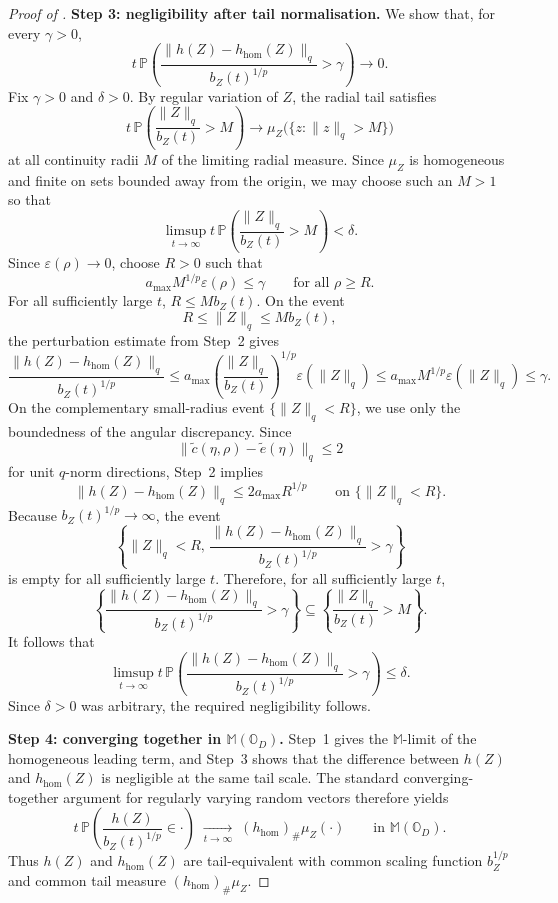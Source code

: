 \documentclass{article}
\theoremstyle{definition}
\begin{document}
\begin{proof}[Proof of ]
\textbf{Step 3: negligibility after tail normalisation.}
We show that, for every \(\gamma>0\),
\[
t\,\mathbb{P}\!\left(
\frac{\|h(Z)-h_{\mathrm{hom}}(Z)\|_q}{b_Z(t)^{1/p}}>\gamma
\right)
\longrightarrow0.
\]
Fix \(\gamma>0\) and \(\delta>0\). By regular variation of \(Z\), the radial
tail satisfies
\[
t\,\mathbb{P}\!\left(\frac{\|Z\|_q}{b_Z(t)}>M\right)
\longrightarrow
\mu_Z\bigl(\{z:\|z\|_q>M\}\bigr)
\]
at all continuity radii \(M\) of the limiting radial measure. Since
\(\mu_Z\) is homogeneous and finite on sets bounded away from the origin,
we may choose such an \(M>1\) so that
\[
\limsup_{t\to\infty}
t\,\mathbb{P}\!\left(\frac{\|Z\|_q}{b_Z(t)}>M\right)
<\delta.
\]
Since \(\varepsilon(\rho)\to0\), choose \(R>0\) such that
\[
a_{\max}M^{1/p}\varepsilon(\rho)\le\gamma
\qquad
\text{for all }\rho\ge R.
\]
For all sufficiently large \(t\), \(R\le M b_Z(t)\). On the event
\[
R\le \|Z\|_q\le M b_Z(t),
\]
the perturbation estimate from Step~2 gives
\[
\frac{\|h(Z)-h_{\mathrm{hom}}(Z)\|_q}{b_Z(t)^{1/p}}
\le
a_{\max}
\left(\frac{\|Z\|_q}{b_Z(t)}\right)^{1/p}
\varepsilon(\|Z\|_q)
\le
a_{\max}M^{1/p}\varepsilon(\|Z\|_q)
\le
\gamma.
\]
On the complementary small-radius event \(\{\|Z\|_q<R\}\), we use only the
boundedness of the angular discrepancy. Since
\[
\|\tilde c(\eta,\rho)-\tilde e(\eta)\|_q\le 2
\]
for unit \(q\)-norm directions, Step~2 implies
\[
\|h(Z)-h_{\mathrm{hom}}(Z)\|_q
\le
2a_{\max}R^{1/p}
\qquad
\text{on }\{\|Z\|_q<R\}.
\]
Because \(b_Z(t)^{1/p}\to\infty\), the event
\[
\left\{
\|Z\|_q<R,\,
\frac{\|h(Z)-h_{\mathrm{hom}}(Z)\|_q}{b_Z(t)^{1/p}}>\gamma
\right\}
\]
is empty for all sufficiently large \(t\). Therefore, for all sufficiently
large \(t\),
\[
\left\{
\frac{\|h(Z)-h_{\mathrm{hom}}(Z)\|_q}{b_Z(t)^{1/p}}>\gamma
\right\}
\subseteq
\left\{\frac{\|Z\|_q}{b_Z(t)}>M\right\}.
\]
It follows that
\[
\limsup_{t\to\infty}
t\,\mathbb{P}\!\left(
\frac{\|h(Z)-h_{\mathrm{hom}}(Z)\|_q}{b_Z(t)^{1/p}}>\gamma
\right)
\le \delta.
\]
Since \(\delta>0\) was arbitrary, the required negligibility follows.

\textbf{Step 4: converging together in \(\mathbb{M}(\mathbb{O}_D)\).}
Step~1 gives the \(\mathbb{M}\)-limit of the homogeneous leading term, and
Step~3 shows that the difference between \(h(Z)\) and \(h_{\mathrm{hom}}(Z)\)
is negligible at the same tail scale. The standard converging-together
argument for regularly varying random vectors therefore yields
\[
t\,\mathbb{P}\!\left(
\frac{h(Z)}{b_Z(t)^{1/p}}\in\cdot
\right)
\;\xrightarrow[t\to\infty]{}\;
(h_{\mathrm{hom}})_{\#}\mu_Z(\cdot)
\qquad
\text{in }\mathbb{M}(\mathbb{O}_D).
\]
Thus \(h(Z)\) and \(h_{\mathrm{hom}}(Z)\) are tail-equivalent with common
scaling function \(b_Z^{1/p}\) and common tail measure
\((h_{\mathrm{hom}})_{\#}\mu_Z\).
\end{proof}
\end{document}
